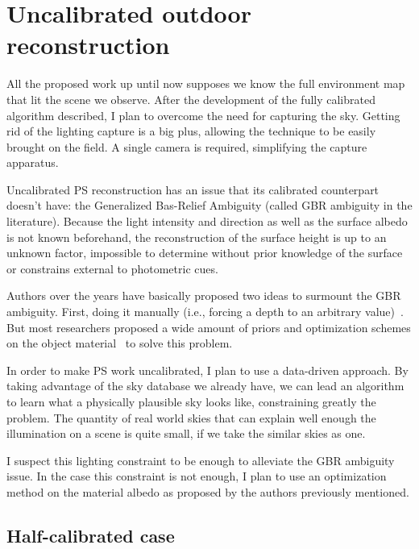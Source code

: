 \documentclass{report}
\begin{document}
\section{Uncalibrated outdoor reconstruction}
\label{sec:uncalib}

All the proposed work up until now supposes we know the full environment map that lit the scene we observe. After the development of the fully calibrated algorithm described, I plan to overcome the need for capturing the sky. Getting rid of the lighting capture is a big plus, allowing the technique to be easily brought on the field. A single camera is required, simplifying the capture apparatus.

Uncalibrated PS reconstruction has an issue that its calibrated counterpart doesn't have: the Generalized Bas-Relief Ambiguity (called GBR ambiguity in the literature). Because the light intensity and direction as well as the surface albedo is not known beforehand, the reconstruction of the surface height is up to an unknown factor, impossible to determine without prior knowledge of the surface or constrains external to photometric cues.

Authors over the years have basically proposed two ideas to surmount the GBR ambiguity. First, doing it manually (i.e., forcing a depth to an arbitrary value)~\cite{basri-ijcv-2007}. But most researchers proposed a wide amount of priors and optimization schemes on the object material~\cite{tan-cvpr-07,alldrin-cvpr-08,abrams-eccv-12,queau-jmiv-14} to solve this problem.

In order to make PS work uncalibrated, I plan to use a data-driven approach. By taking advantage of the sky database we already have, we can lead an algorithm to learn what a physically plausible sky looks like, constraining greatly the problem. The quantity of real world skies that can explain well enough the illumination on a scene is quite small, if we take the similar skies as one.

I suspect this lighting constraint to be enough to alleviate the GBR ambiguity issue. In the case this constraint is not enough, I plan to use an optimization method on the material albedo as proposed by the authors previously mentioned.

\subsection{Half-calibrated case}
\end{document}
